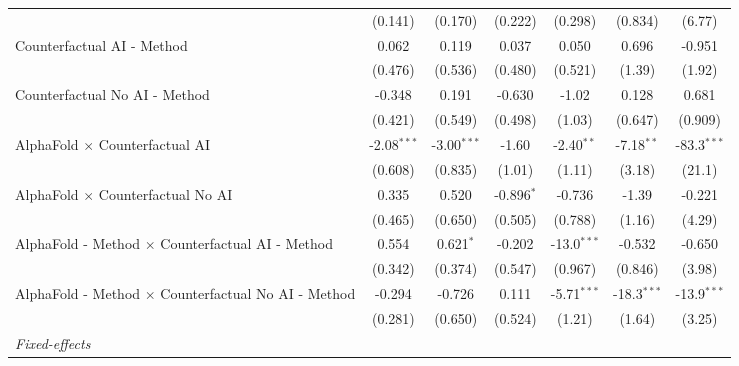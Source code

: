 \begin{tabular}{lcccccc}
                                                              & (0.141)       & (0.170)       & (0.222)      & (0.298)       & (0.834)       & (6.77)\\   
   Counterfactual AI - Method                                 & 0.062         & 0.119         & 0.037        & 0.050         & 0.696         & -0.951\\   
                                                              & (0.476)       & (0.536)       & (0.480)      & (0.521)       & (1.39)        & (1.92)\\   
   Counterfactual No AI - Method                              & -0.348        & 0.191         & -0.630       & -1.02         & 0.128         & 0.681\\   
                                                              & (0.421)       & (0.549)       & (0.498)      & (1.03)        & (0.647)       & (0.909)\\   
   AlphaFold $\times$ Counterfactual AI                       & -2.08$^{***}$ & -3.00$^{***}$ & -1.60        & -2.40$^{**}$  & -7.18$^{**}$  & -83.3$^{***}$\\   
                                                              & (0.608)       & (0.835)       & (1.01)       & (1.11)        & (3.18)        & (21.1)\\   
   AlphaFold $\times$ Counterfactual No AI                    & 0.335         & 0.520         & -0.896$^{*}$ & -0.736        & -1.39         & -0.221\\   
                                                              & (0.465)       & (0.650)       & (0.505)      & (0.788)       & (1.16)        & (4.29)\\   
   AlphaFold - Method $\times$ Counterfactual AI - Method     & 0.554         & 0.621$^{*}$   & -0.202       & -13.0$^{***}$ & -0.532        & -0.650\\   
                                                              & (0.342)       & (0.374)       & (0.547)      & (0.967)       & (0.846)       & (3.98)\\   
   AlphaFold - Method $\times$ Counterfactual No AI - Method  & -0.294        & -0.726        & 0.111        & -5.71$^{***}$ & -18.3$^{***}$ & -13.9$^{***}$\\   
                                                              & (0.281)       & (0.650)       & (0.524)      & (1.21)        & (1.64)        & (3.25)\\   
   \midrule
   \emph{Fixed-effects}\\

\end{tabular}
